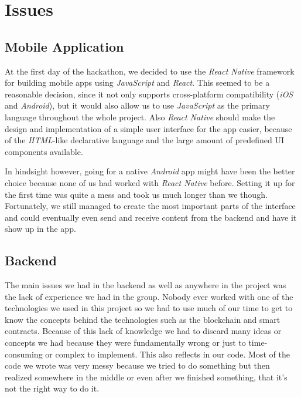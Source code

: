 \documentclass[12pt]{report}
\begin{document}
\section{Issues}

\subsection{Mobile Application}
At the first day of the hackathon, we decided to use the \emph{React Native} framework for building mobile apps using \emph{JavaScript} and \emph{React}. This seemed to be a reasonable decision, since it not only supports cross-platform compatibility (\emph{iOS} and \emph{Android}), but it would also allow us to use \emph{JavaScript} as the primary language throughout the whole project. Also \emph{React Native} should make the design and implementation of a simple user interface for the app easier, because of the \emph{HTML}-like declarative language and the large amount of predefined UI components available.

In hindsight however, going for a native \emph{Android} app might have been the better choice because none of us had worked with \emph{React Native} before. Setting it up for the first time was quite a mess and took us much longer than we though. Fortunately, we still managed to create the most important parts of the interface and could eventually even send and receive content from the backend and have it show up in the app.

\subsection{Backend}
The main issues we had in the backend as well as anywhere in the project was the lack of experience we had in the group.
Nobody ever worked with one of the technologies we used in this project so we had to use much of our time to get to know the concepts behind the technologies such as the blockchain and smart contracts.
Because of this lack of knowledge we had to discard many ideas or concepts we had because they were fundamentally wrong or just to time-consuming or complex to implement.
This also reflects in our code.
Most of the code we wrote was very messy because we tried to do something but then realized somewhere in the middle or even after we finished something, that it's not the right way to do it.
\end{document}
